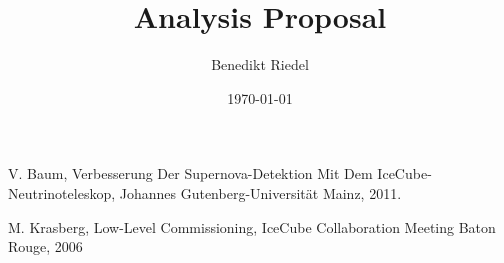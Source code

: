 \documentclass[10pt]{article}
\title{Analysis Proposal}
\author{Benedikt Riedel}
\date{\today}
\begin{document}
\maketitle







% 
\begin{thebibliography}{2}

 V. Baum, Verbesserung Der Supernova-Detektion Mit Dem IceCube-Neutrinoteleskop, Johannes Gutenberg-Universit\"{a}t Mainz, 2011.

 M. Krasberg, Low-Level Commissioning, IceCube Collaboration Meeting Baton Rouge, 2006

\end{thebibliography}
\end{document}
